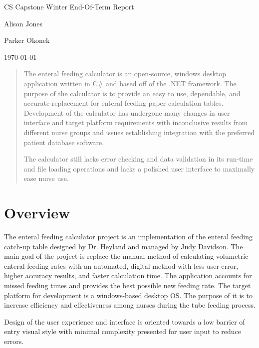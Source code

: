 \documentclass[onecolumn, draftclsnofoot,10pt, compsoc]{IEEEtran}
\def \GroupMemberOne{			Alison Jones}
\def \GroupMemberTwo{			Parker Okonek}
\def \DocType{
				Winter End-Of-Term Report
				}
\begin{document}
\begin{titlepage}
    \begin{singlespace}
        \hfill 
        \par\vspace{.2in}
        \centering
        \scshape{
            \huge CS Capstone \DocType \par
             \large\GroupMemberOne\par
            \large\GroupMemberTwo\par
            {\large\today}\par
        }
        \vfill
    \begin{abstract}
        The enteral feeding calculator is an open-source, windows desktop application written in C\# and based off of the .NET framework.
        The purpose of the calculator is to provide an easy to use, dependable, and accurate replacement for enteral feeding paper calculation tables.
        Development of the calculator has undergone many changes in user interface and target platform requirements with inconclusive results from different nurse groups and issues establishing integration with the preferred patient database software.
        
        The calculator still lacks error checking and data validation in its run-time and file loading operations and lacks a polished user interface to maximally ease nurse use.
    \end{abstract}
    \end{singlespace}
    \end{titlepage}
    \clearpage
{}
\section{Overview}
The enteral feeding calculator project is an implementation of the enteral feeding catch-up table designed by Dr. Heyland and managed by Judy Davidson.
The main goal of the project is replace the manual method of calculating volumetric enteral feeding rates with an automated, digital method with less user error, higher accuracy results, and faster calculation time.
The application accounts for missed feeding times and provides the best possible new feeding rate.
The target platform for development is a windows-based desktop OS.
The purpose of it is to increase efficiency and effectiveness among nurses during the tube feeding process.

Design of the user experience and interface is oriented towards a low barrier of entry visual style with minimal complexity presented for user input to reduce errors.
\end{document}
